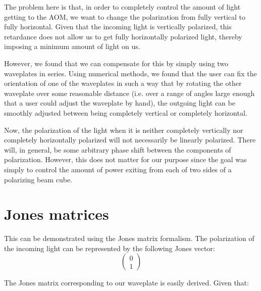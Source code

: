 The problem here is that, in order to completely control the amount of light getting to the AOM, we want to change the polarization from fully vertical to fully horizontal. Given that the incoming light is vertically polarized, this retardance does not allow us to get fully horizontally polarized light, thereby imposing a minimum amount of light on us.

However, we found that we can compensate for this by simply using two waveplates in series. Using numerical methods, we found that the user can fix the orientation of one of the waveplates in such a way that by rotating the other waveplate over some reasonable distance (i.e. over a range of angles large enough that a user could adjust the waveplate by hand), the outgoing light can be smoothly adjusted between being completely vertical or completely horizontal. 

Now, the polarization of the light when it is neither completely vertically nor completely horizontally polarized will not necessarily be linearly polarized. There will, in general, be some arbitrary phase shift between the components of polarization. However, this does not matter for our purpose since the goal was simply to control the amount of power exiting from each of two sides of a polarizing beam cube. 

\section{Jones matrices}
This can be demonstrated using the Jones matrix formalism. The polarization of the incoming light can be represented by the following Jones vector: 
\begin{equation}
\begin{pmatrix}
0\\1
\end{pmatrix}
\end{equation}

The Jones matrix corresponding to our waveplate is easily derived. Given that: 

